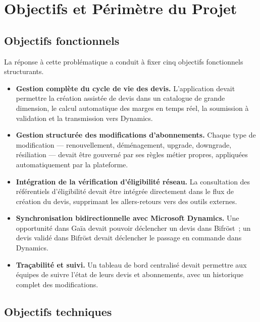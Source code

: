 \section{Objectifs et P\'erim\`etre du Projet}

\subsection{Objectifs fonctionnels}

La r\'eponse \`a cette probl\'ematique a conduit \`a fixer cinq objectifs fonctionnels structurants.

\begin{itemize}[label=\textendash]
    \item \textbf{Gestion compl\`ete du cycle de vie des devis.} L'application devait permettre la cr\'eation assist\'ee de devis dans un catalogue de grande dimension, le calcul automatique des marges en temps r\'eel, la soumission \`a validation et la transmission vers Dynamics.
    
    \item \textbf{Gestion structur\'ee des modifications d'abonnements.} Chaque type de modification --- renouvellement, d\'em\'enagement, upgrade, downgrade, r\'esiliation --- devait \^etre gouvern\'e par ses r\`egles m\'etier propres, appliqu\'ees automatiquement par la plateforme.
    
    \item \textbf{Int\'egration de la v\'erification d'\'eligibilit\'e r\'eseau.} La consultation des r\'ef\'erentiels d'\'eligibilit\'e devait \^etre int\'egr\'ee directement dans le flux de cr\'eation du devis, supprimant les allers-retours vers des outils externes.
    
    \item \textbf{Synchronisation bidirectionnelle avec Microsoft Dynamics.} Une opportunit\'e dans Ga\"ia devait pouvoir d\'eclencher un devis dans Bifr\"ost~; un devis valid\'e dans Bifr\"ost devait d\'eclencher le passage en commande dans Dynamics.
    
    \item \textbf{Tra\c{c}abilit\'e et suivi.} Un tableau de bord centralis\'e devait permettre aux \'equipes de suivre l'\'etat de leurs devis et abonnements, avec un historique complet des modifications.
\end{itemize}

\subsection{Objectifs techniques}

